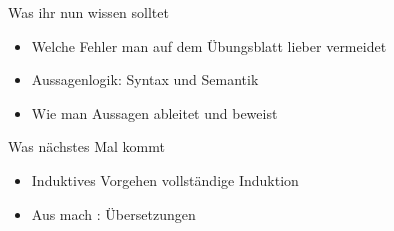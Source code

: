 %





\begin{frame}	
	\begin{block}{Was ihr nun wissen solltet}
		\begin{itemize}
			\item Welche Fehler man auf dem Übungsblatt lieber vermeidet \smiley
			\item Aussagenlogik: Syntax und Semantik
			\item Wie man Aussagen ableitet und beweist
		\end{itemize}
	\end{block}
	
	\begin{block}{Was nächstes Mal kommt}
		\begin{itemize}
			\item Induktives Vorgehen \impl vollständige Induktion
			\item Aus  mach : Übersetzungen
		\end{itemize}
	\end{block}
\end{frame}

\slideThanks



